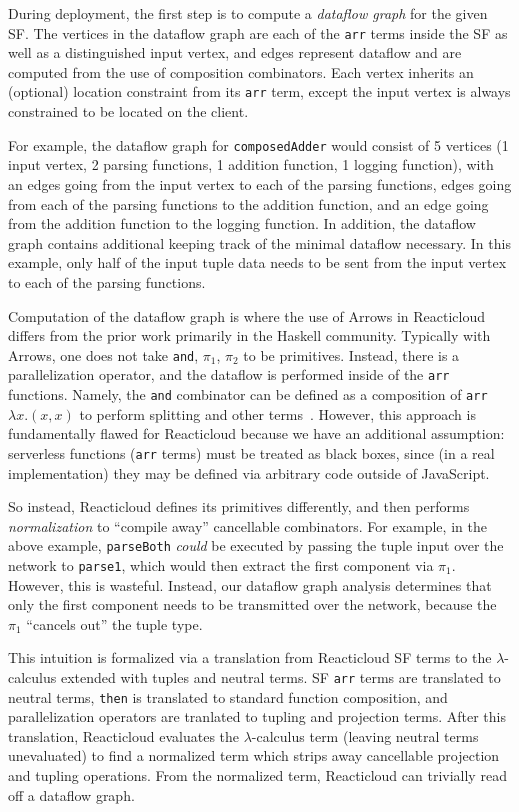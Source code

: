 \documentclass[10pt,sigplan,screen,nonacm]{acmart}
\begin{document}
During deployment, the first step is to compute a
\emph{dataflow graph} for the given SF. The vertices in the
dataflow graph are each of the \texttt{arr} terms inside the SF as
well as a distinguished input vertex, and
edges represent dataflow and are computed from the use of composition combinators.
Each vertex inherits an (optional) location constraint from its \texttt{arr} term,
except the input vertex is always constrained to be located on the client.

For example, the dataflow graph for \texttt{composedAdder} would consist of
5 vertices (1 input vertex, 2 parsing functions, 1 addition function, 1 logging function),
with an edges going from the input vertex to each of the parsing functions,
edges going from each of the parsing functions to the addition function,
and an edge going from the addition function to the logging function.
In addition, the dataflow graph contains additional keeping track
of the minimal dataflow necessary. In this example, only half of the input
tuple data needs to be sent from the input vertex to each of the parsing functions.

Computation of the dataflow graph is where the use of Arrows
in Reacticloud differs from the prior work primarily in the Haskell
community. Typically with Arrows, one does not take \texttt{and},
$\pi_1$, $\pi_2$ to be primitives. Instead, there is a parallelization operator,
and the dataflow is performed inside of the \texttt{arr} functions.
Namely, the \texttt{and} combinator can be defined as a composition of
\texttt{arr}~$\lambda x. (x, x)$ to perform splitting 
and other terms~\cite{hughes:arrows}. However, this approach
is fundamentally flawed for Reacticloud because we have an additional assumption:
serverless functions (\texttt{arr} terms) must be treated as black boxes,
since (in a real implementation) they may be defined via arbitrary code
outside of JavaScript. 

So instead, Reacticloud defines its primitives differently, and then
performs \emph{normalization} to ``compile away'' cancellable combinators.
For example, in the above example, \texttt{parseBoth} \emph{could} be executed
by passing the tuple input over the network to \texttt{parse1}, which would
then extract the first component via $\pi_1$. However, this is wasteful. Instead,
our dataflow graph analysis determines that only the first component needs to be
transmitted over the network, because the $\pi_1$ ``cancels out'' the tuple type.

This intuition is formalized via a translation from Reacticloud SF terms
to the $\lambda$-calculus extended with tuples and neutral terms.
SF \texttt{arr} terms are translated to neutral terms, \texttt{then}
is translated to standard function composition, and parallelization operators
are tranlated to tupling and projection terms. After this translation,
Reacticloud evaluates the $\lambda$-calculus term 
(leaving neutral terms unevaluated) to find a normalized term which
strips away cancellable projection and tupling operations.
From the normalized term, Reacticloud can trivially read off
a dataflow graph.
\end{document}
